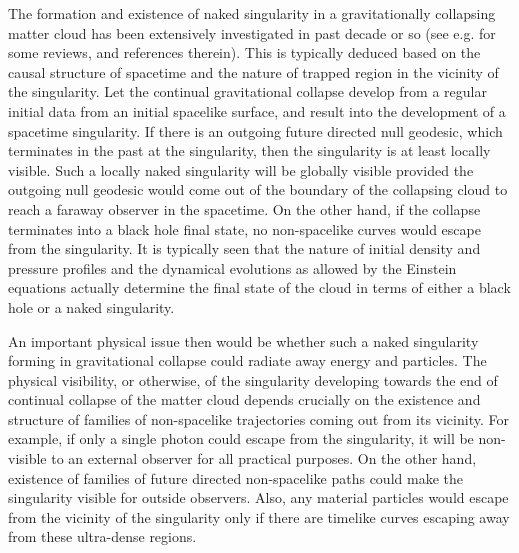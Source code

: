\documentclass[twocolumn,aps,amsmath,amssymb,prl,showpacs,preprintnumbers]
{revtex4}
\begin{document}
The formation and existence of naked singularity in a 
gravitationally collapsing matter cloud has been extensively
investigated in past decade or so (see e.g. 
\cite{rev} 
for some reviews, and references therein). This is typically deduced 
based on the causal structure of spacetime and the nature of trapped 
region in the vicinity of the singularity. Let the continual gravitational 
collapse develop from a regular initial data from an initial 
spacelike surface, and result into the development of a spacetime 
singularity. If there is an outgoing future directed null geodesic, 
which terminates in the past at the singularity, then the singularity
is at least locally visible. Such a locally naked singularity will   
be globally visible provided the outgoing null geodesic would come out 
of the boundary of the collapsing cloud to reach a faraway observer 
in the spacetime. On the other hand, if the collapse terminates into 
a black hole final state, no non-spacelike curves would escape 
from the singularity. It is typically seen that the nature of 
initial density and pressure profiles and the dynamical evolutions 
as allowed by the Einstein equations actually determine the final 
state of the cloud in terms of either a black hole or a naked 
singularity.


An important physical issue then would be whether such a naked 
singularity forming in gravitational collapse could radiate away 
energy and particles. The physical visibility, or otherwise, of the 
singularity developing towards the end of continual collapse of the 
matter cloud depends crucially on the existence and structure of 
families of non-spacelike trajectories coming out from its vicinity. 
For example, if only a single photon could escape from the singularity, 
it will be non-visible to an external observer for all practical 
purposes. On the other hand, existence of families of future directed 
non-spacelike paths could make the singularity visible for outside 
observers. Also, any material particles would escape from the 
vicinity of the singularity only if there are timelike curves 
escaping away from these ultra-dense regions.
\end{document}
